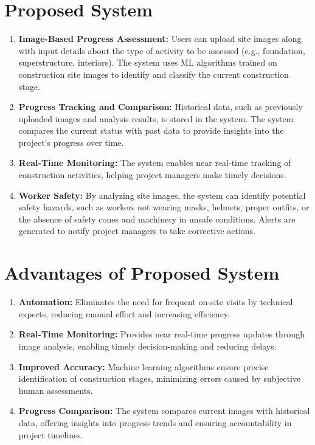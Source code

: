 \section{Proposed System}
\begin{enumerate}
    \item \textbf{Image-Based Progress Assessment:} Users can upload site images along with input details about the type of activity to be assessed (e.g., foundation, superstructure, interiors). The system uses ML algorithms trained on construction site images to identify and classify the current construction stage.
    \item \textbf{Progress Tracking and Comparison:} Historical data, such as previously uploaded images and analysis results, is stored in the system. The system compares the current status with past data to provide insights into the project's progress over time.
    \item \textbf{Real-Time Monitoring:} The system enables near real-time tracking of construction activities, helping project managers make timely decisions.
    \item \textbf{Worker Safety:} By analyzing site images, the system can identify potential safety hazards, such as workers not wearing masks, helmets, proper outfits, or the absence of safety cones and machinery in unsafe conditions. Alerts are generated to notify project managers to take corrective actions.
\end{enumerate}

\section{Advantages of Proposed System}
\begin{enumerate}
    \item \textbf{Automation:} Eliminates the need for frequent on-site visits by technical experts, reducing manual effort and increasing efficiency.
    \item \textbf{Real-Time Monitoring:} Provides near real-time progress updates through image analysis, enabling timely decision-making and reducing delays.
    \item \textbf{Improved Accuracy:} Machine learning algorithms ensure precise identification of construction stages, minimizing errors caused by subjective human assessments.
    \item \textbf{Progress Comparison:} The system compares current images with historical data, offering insights into progress trends and ensuring accountability in project timelines.
\end{enumerate}



